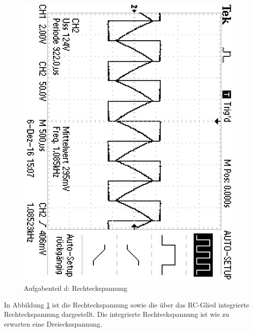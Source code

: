 \begin{figure}
	\centering
	\includegraphics[angle=90]{bilder/ALL0001/F0001TEK.JPG}
	\caption{Aufgabenteil d: Rechteckspannung}
	\label{fig:rechteck}
\end{figure}

In Abbildung \ref{fig:rechteck} ist die Rechteckspannung sowie die über das RC-Glied integrierte Rechteckspannung dargestellt.
Die integrierte Rechteckspannung ist wie zu erwarten eine Dreiecksspannung.


